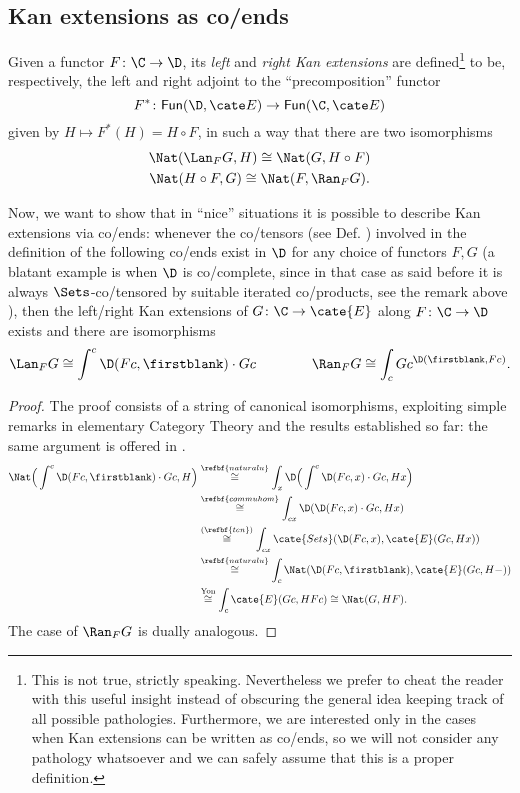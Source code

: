 \subsection{Kan extensions as co/ends}
\begin{definition}\label{kann}
Given a functor $F\colon \C\to \D$, its \emph{left} and \emph{right Kan extensions} are defined\footnote{This is not true, strictly speaking. Nevertheless we prefer to cheat the reader with this useful insight instead of obscuring the general idea keeping track of all possible pathologies. Furthermore, we are interested only in the cases when Kan extensions can be written as co/ends, so we will not consider any pathology whatsoever and we can safely assume that this is a proper definition.} to be, respectively, the left and right adjoint to the ``precomposition'' functor
\[
F^*\colon \textsf{Fun}(\D,\cate E)\to \textsf{Fun}(\C,\cate E)
\]
given by $H\mapsto F^*(H)=H\circ F$, in such a way that there are two  
isomorphisms
\begin{gather*}
\Nat(\Lan_FG,H)\cong \Nat(G, H\circ F)\\
\Nat(H\circ F,G)\cong \Nat(F, \Ran_FG).
\end{gather*}
\end{definition}
Now, we want to show that in ``nice'' situations it is possible to describe Kan extensions via co/ends: whenever the co/tensors (see Def. ) involved in the definition of the following co/ends exist in $\D$ for any choice of functors $F,G$ (a blatant example is when $\D$ is co/complete, since in that case as said before it is always $\Sets$-co/tensored by suitable iterated co/products, see the remark above ), then the left/right Kan extensions of $G\colon \C\to\cate{E}$ along $F\colon \C\to \D$ exists and there are isomorphisms
\[\label{kanend}
\Lan_FG\cong \int^c \D(Fc,\firstblank)\cdot Gc\qquad\qquad 
\Ran_FG\cong \int_c Gc^{\D(\firstblank,Fc)}.
\]
\begin{proof}
The proof consists of a string of canonical isomorphisms, exploiting simple remarks in elementary Category Theory and the results established so far: the same argument is offered in \cite[Thm\@. \textbf{X.4.1, 2}]{McL}.
\begin{align*}
\Nat\Big( \int^c \D(Fc,\firstblank)\cdot Gc,H\Big)&\overset{\refbf{naturalu}}{\cong} \int_x\D\Big( \int^c \D(Fc,x)\cdot Gc,Hx \Big)\\
&\overset{\refbf{commuhom}}{\cong} \int_{cx}\D(\D(Fc,x)\cdot Gc,Hx)\\
&\overset{(\refbf{ten})}{\cong} \int_{cx}\cate{Sets}(\D(Fc,x),\cate{E}(Gc,Hx))\\
&\overset{\refbf{naturalu}}{\cong}\int_c\Nat(\D(Fc,\firstblank),\cate{E}(Gc,H-))\\
&\overset{\text{Yon}}{\cong} \int_c \cate{E}(Gc,HFc)\cong\Nat(G,HF).
\end{align*}
The case of $\Ran_FG$ is dually analogous.
\end{proof}

